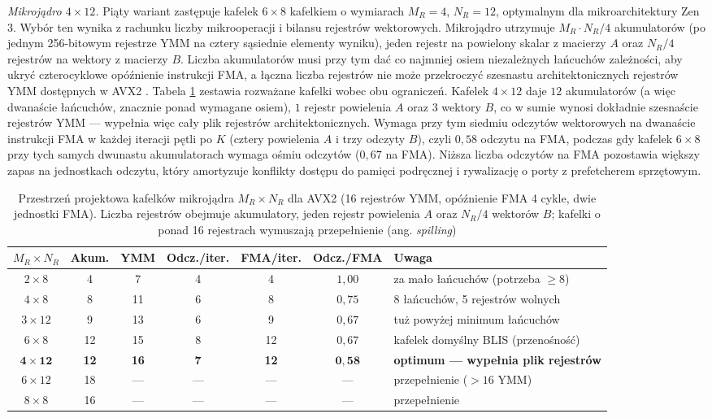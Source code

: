 \documentclass[a4paper,12pt]{book} %
\begin{document}
\emph{Mikrojądro $4 \times 12$.} Piąty wariant zastępuje kafelek $6 \times 8$ kafelkiem o wymiarach $M_R = 4$, $N_R = 12$, optymalnym dla mikroarchitektury Zen 3. Wybór ten wynika z rachunku liczby mikrooperacji i bilansu rejestrów wektorowych. Mikrojądro utrzymuje $M_R \cdot N_R / 4$ akumulatorów (po jednym 256-bitowym rejestrze YMM na cztery sąsiednie elementy wyniku), jeden rejestr na powielony skalar z macierzy $A$ oraz $N_R / 4$ rejestrów na wektory z macierzy $B$. Liczba akumulatorów musi przy tym dać co najmniej osiem niezależnych łańcuchów zależności, aby ukryć czterocyklowe opóźnienie instrukcji FMA, a łączna liczba rejestrów nie może przekroczyć szesnastu architektonicznych rejestrów YMM dostępnych w AVX2 \cite{fog_microarchitecture}. Tabela \ref{tab:gemm-tile} zestawia rozważane kafelki wobec obu ograniczeń. Kafelek $4 \times 12$ daje $12$ akumulatorów (a więc dwanaście łańcuchów, znacznie ponad wymagane osiem), $1$ rejestr powielenia $A$ oraz $3$ wektory $B$, co w sumie wynosi dokładnie szesnaście rejestrów YMM --- wypełnia więc cały plik rejestrów architektonicznych. Wymaga przy tym siedmiu odczytów wektorowych na dwanaście instrukcji FMA w każdej iteracji pętli po $K$ (cztery powielenia $A$ i trzy odczyty $B$), czyli $0{,}58$ odczytu na FMA, podczas gdy kafelek $6 \times 8$ przy tych samych dwunastu akumulatorach wymaga ośmiu odczytów ($0{,}67$ na FMA). Niższa liczba odczytów na FMA pozostawia większy zapas na jednostkach odczytu, który amortyzuje konflikty dostępu do pamięci podręcznej i rywalizację o porty z prefetcherem sprzętowym.

\begin{table}[t!]
\centering
  \caption{Przestrzeń projektowa kafelków mikrojądra $M_R \times N_R$ dla AVX2 (16 rejestrów YMM, opóźnienie FMA 4 cykle, dwie jednostki FMA). Liczba rejestrów obejmuje akumulatory, jeden rejestr powielenia $A$ oraz $N_R/4$ wektorów $B$; kafelki o ponad 16 rejestrach wymuszają przepełnienie (ang. \emph{spilling})}
\label{tab:gemm-tile}
\small
\setlength{\tabcolsep}{4pt}
\begin{tabular}{ccccccp{}}
\hline
$M_R \times N_R$ & Akum. & YMM & Odcz./iter. & FMA/iter. & Odcz./FMA & Uwaga \\
\hline
$2 \times 8$  & 4  & 7  & 4 & 4  & $1{,}00$ & za mało łańcuchów (potrzeba $\ge 8$) \\
$4 \times 8$  & 8  & 11 & 6 & 8  & $0{,}75$ & 8 łańcuchów, 5 rejestrów wolnych \\
$3 \times 12$ & 9  & 13 & 6 & 9  & $0{,}67$ & tuż powyżej minimum łańcuchów \\
$6 \times 8$  & 12 & 15 & 8 & 12 & $0{,}67$ & kafelek domyślny BLIS (przenośność) \\
$\mathbf{4 \times 12}$ & \textbf{12} & \textbf{16} & \textbf{7} & \textbf{12} & $\mathbf{0{,}58}$ & \textbf{optimum --- wypełnia plik rejestrów} \\
$6 \times 12$ & 18 & --- & --- & --- & --- & przepełnienie ($> 16$ YMM) \\
$8 \times 8$  & 16 & --- & --- & --- & --- & przepełnienie \\
\hline
\end{tabular}
\end{table}
\end{document}
